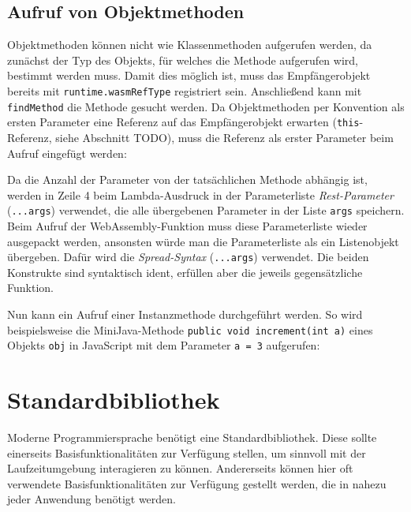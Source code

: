 \subsection{Aufruf von Objektmethoden}

Objektmethoden können nicht wie Klassenmethoden aufgerufen werden, da zunächst der Typ des Objekts, für welches die Methode aufgerufen wird, bestimmt werden muss. Damit dies möglich ist, muss das Empfängerobjekt bereits mit \lstinline{runtime.wasmRefType} registriert sein. Anschließend kann mit \lstinline{findMethod} die Methode gesucht werden. Da Objektmethoden per Konvention als ersten Parameter eine Referenz auf das Empfängerobjekt erwarten (\lstinline{this}-Referenz, siehe Abschnitt TODO), muss die Referenz als erster Parameter beim Aufruf eingefügt werden:



Da die Anzahl der Parameter von der tatsächlichen Methode abhängig ist, werden in Zeile 4 beim Lambda-Ausdruck in der Parameterliste \emph{Rest-Parameter} (\lstinline{...args}) \cite{MDNJavaScript} verwendet, die alle übergebenen Parameter in der Liste \lstinline{args} speichern. Beim Aufruf der WebAssembly-Funktion muss diese Parameterliste wieder ausgepackt werden, ansonsten würde man die Parameterliste als ein Listenobjekt übergeben. Dafür wird die \emph{Spread-Syntax} (\lstinline{...args}) verwendet. Die beiden Konstrukte sind syntaktisch ident, erfüllen aber die jeweils gegensätzliche Funktion.

Nun kann ein Aufruf einer Instanzmethode durchgeführt werden. So wird beispielsweise die MiniJava-Methode \lstinline{public void increment(int a)} eines Objekts \lstinline{obj} in JavaScript mit dem Parameter \lstinline{a = 3} aufgerufen:



\section{Standardbibliothek}
\label{sec:Standardbibliothek}

Moderne Programmiersprache benötigt eine Standardbibliothek. Diese sollte einerseits Basisfunktionalitäten zur Verfügung stellen, um sinnvoll mit der Laufzeitumgebung interagieren zu können. Andererseits können hier oft verwendete Basisfunktionalitäten zur Verfügung gestellt werden, die in nahezu jeder Anwendung benötigt werden.

